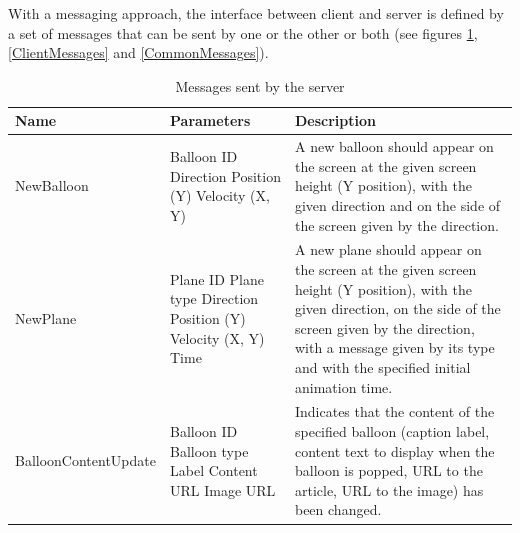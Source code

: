 With a messaging approach, the interface between client and server is defined by 
a set of messages that can be sent by one or the other or both (see figures 
\ref{ServerMessages}, \ref{ClientMessages} and \vref{CommonMessages}).

\begin{table}
\begin{tabular}{|>{\raggedright}p{4.3cm}|>{\raggedright}p{2.8cm}|>{\raggedright}p{8.7cm}|}
\hline 
Name & Parameters & Description\tabularnewline
\hline 
NewBalloon
& Balloon ID 
\newline Direction
\newline Position (Y)
\newline Velocity (X, Y)
& A new balloon should appear on the screen at the given screen height (Y position),
with the given direction and on the side of the screen given by the direction.
\tabularnewline
\hline 
NewPlane
& Plane ID 
\newline Plane type
\newline Direction
\newline Position (Y)
\newline Velocity (X, Y)
\newline Time
& A new plane should appear on the screen at the given screen height (Y position),
with the given direction, on the side of the screen given by the direction, with
a message given by its type and with the specified initial animation time.
\tabularnewline
\hline 
BalloonContentUpdate
& Balloon ID 
\newline Balloon type
\newline Label
\newline Content
\newline URL
\newline Image URL
& Indicates that the content of the specified balloon (caption label, content
text to display when the balloon is popped, URL to the article, URL to the image) 
has been changed. 
\tabularnewline
\hline 
\end{tabular}

\caption{Messages sent by the server}

\label{ServerMessages}
\end{table}

